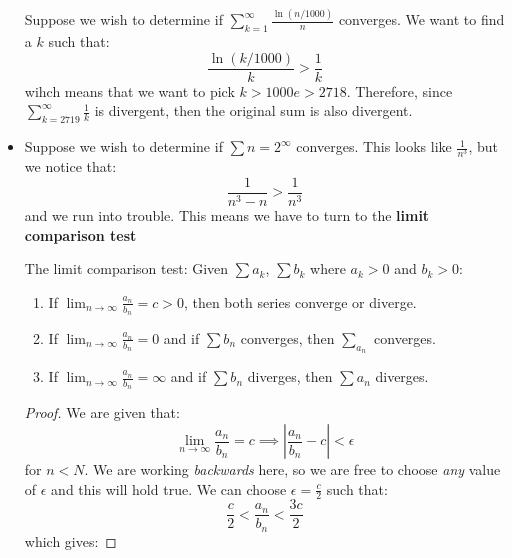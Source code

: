 \begin{itemize}
\begin{example}
    \end{example}
    \begin{example}
        Suppose we wish to determine if $\sum_{k=1}^\infty \frac{\ln(n/1000)}{n}$ converges. We want to find a $k$ such that:
        \begin{equation}
            \frac{\ln(k/1000)}{k} > \frac{1}{k}
        \end{equation}
        wihch means that we want to pick $k > 1000e > 2718$. Therefore, since $\sum_{k=2719}^\infty \frac{1}{k}$ is divergent, then the original sum is also divergent.
    \end{example}
    \item Suppose we wish to determine if $\sum{n=2}^\infty$ converges. This looks like $\frac{1}{n^3}$, but we notice that:
        \begin{equation}
            \frac{1}{n^3-n} > \frac{1}{n^3}
        \end{equation}
        and we run into trouble. This means we have to turn to the \textbf{limit comparison test}
    \begin{theorem}
        The limit comparison test: Given $\sum a_k$, $\sum b_k$ where $a_k > 0 $ and $b_k > 0$:
        \begin{enumerate}
            \item If $\lim_{n\to\infty} \frac{a_n}{b_n} = c > 0$, then both series converge or diverge.
            \item If $\lim_{n\to\infty} \frac{a_n}{b_n} = 0$ and if $\sum b_{n}$ converges, then $\sum_{a_n}$ converges.
            \item If $\lim_{n\to\infty} \frac{a_n}{b_n} = \infty$ and if $\sum b_n$ diverges, then $\sum a_n$ diverges.
        \end{enumerate}
    \end{theorem}
    \begin{proof}
        We are given that:
        \begin{equation}
            \lim_{n\to\infty} \frac{a_n}{b_n} = c \implies \left|\frac{a_n}{b_n}-c\right| < \epsilon
        \end{equation}
        for $n<N$. We are working \textit{backwards} here, so we are free to choose \textit{any} value of $\epsilon$ and this will hold true. We can choose $\epsilon = \frac{c}{2}$ such that:
        \begin{equation}
            \frac{c}{2} < \frac{a_n}{b_n} < \frac{3c}{2}
        \end{equation}
        which gives:

\end{proof}
\end{itemize}
